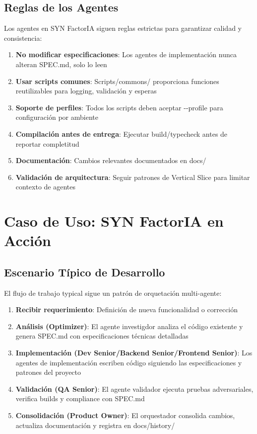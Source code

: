 \documentclass[12pt,a4paper,spanish]{article}
\begin{document}
\subsection{Reglas de los Agentes}

Los agentes en SYN FactorIA siguen reglas estrictas para garantizar calidad y consistencia:

\begin{enumerate}
    \item \textbf{No modificar especificaciones}: Los agentes de implementación nunca alteran SPEC.md, solo lo leen
    \item \textbf{Usar scripts comunes}: Scripts/commons/ proporciona funciones reutilizables para logging, validación y esperas
    \item \textbf{Soporte de perfiles}: Todos los scripts deben aceptar -{}-profile para configuración por ambiente
    \item \textbf{Compilación antes de entrega}: Ejecutar build/typecheck antes de reportar completitud
    \item \textbf{Documentación}: Cambios relevantes documentados en docs/
    \item \textbf{Validación de arquitectura}: Seguir patrones de Vertical Slice para limitar contexto de agentes
\end{enumerate}

\newpage

\section{Caso de Uso: SYN FactorIA en Acción}

\subsection{Escenario Típico de Desarrollo}

El flujo de trabajo typical sigue un patrón de orquetación multi-agente:

\begin{enumerate}
    \item \textbf{Recibir requerimiento}: Definición de nueva funcionalidad o corrección
    \item \textbf{Análisis (Optimizer)}: El agente investigdor analiza el código existente y genera SPEC.md con especificaciones técnicas detalladas
    \item \textbf{Implementación (Dev Senior/Backend Senior/Frontend Senior)}: Los agentes de implementación escriben código siguiendo las especificaciones y patrones del proyecto
    \item \textbf{Validación (QA Senior)}: El agente validador ejecuta pruebas adversariales, verifica builds y compliance con SPEC.md
    \item \textbf{Consolidación (Product Owner)}: El orquestador consolida cambios, actualiza documentación y registra en docs/history/
\end{enumerate}
\end{document}
